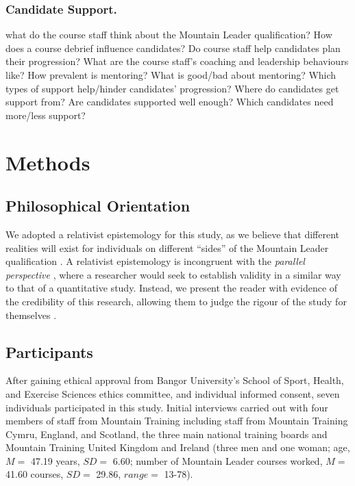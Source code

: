 \documentclass[
  12pt,
  a4paper,
]{book}
\begin{document}
\hypertarget{candidate-support.}{%
\subsubsection{Candidate Support.}\label{candidate-support.}}

what do the course staff think about the Mountain Leader qualification? How does a course debrief influence candidates? Do course staff help candidates plan their progression? What are the course staff's coaching and leadership behaviours like? How prevalent is mentoring? What is good/bad about mentoring? Which types of support help/hinder candidates' progression? Where do candidates get support from? Are candidates supported well enough? Which candidates need more/less support?

\hypertarget{methods}{%
\section{Methods}\label{methods}}

\hypertarget{philosophical-orientation}{%
\subsection{Philosophical Orientation}\label{philosophical-orientation}}

We adopted a relativist epistemology for this study, as we believe that different realities will exist for individuals on different ``sides'' of the Mountain Leader qualification \citep[e.g., candidates and course staff;][]{Sparkes2009}. A relativist epistemology is incongruent with the \emph{parallel perspective} \citep{Sparkes1998}, where a researcher would seek to establish validity in a similar way to that of a quantitative study. Instead, we present the reader with evidence of the credibility of this research, allowing them to judge the rigour of the study for themselves \citep{Sparkes2009}.

\hypertarget{participants}{%
\subsection{Participants}\label{participants}}

After gaining ethical approval from Bangor University's School of Sport, Health, and Exercise Sciences ethics committee, and individual informed consent, seven individuals participated in this study. Initial interviews carried out with four members of staff from Mountain Training including staff from Mountain Training Cymru, England, and Scotland, the three main national training boards and Mountain Training United Kingdom and Ireland (three men and one woman; age, \(M =\) 47.19 years, \(SD =\) 6.60; number of Mountain Leader courses worked, \(M =\) 41.60 courses, \(SD =\) 29.86, \(range =\) 13-78).
\end{document}
